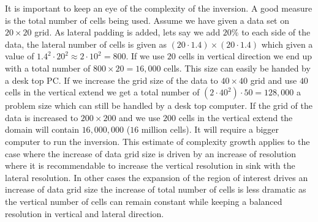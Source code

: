It is important to keep an eye of the complexity of the inversion. A good measure is the total number of cells 
being used. Assume we have given a data set on $20 \times 20$ grid. As lateral padding is added, lets say 
we add $20 \%$ to each side of the data, the lateral number of cells is given as $(20 \cdot 1.4) \times (20 \cdot 1.4)$
which given a value of $1.4^2 \cdot 20^2 \approx 2 \cdot 10^2 = 800$. If we use $20$ cells in vertical direction
we end up with a total number of $800 \times 20 = 16,000$ cells. This size can easily be handed by a desk top PC.
If we increase the grid size of the data to $40 \times 40$ grid and
use $40$ cells in the vertical extend we get a total number of $( 2 \cdot 40^2) \cdot 50 =128,000$ a problem size
which can still be handled by a desk top computer. If the grid of the data is increased 
to $200 \times 200$ and we use $200$ cells in the vertical extend the domain will contain $16,000,000$ ($16$ million cells). 
It will require a bigger computer to run the inversion. This estimate of complexity growth applies to the case where the increase 
of data grid size is driven by an increase of resolution where it is recommendable to increase the 
vertical resolution in sink with the lateral resolution. In other cases the expansion of the region of
interest drives an increase of data grid size the increase of total number of cells is less dramatic as
the vertical number of cells can remain constant while keeping a balanced resolution in vertical and lateral direction.


